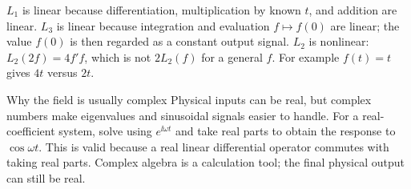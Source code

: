 \begin{answer}
$L_1$ is linear because differentiation, multiplication by known $t$, and addition are linear. $L_3$ is linear because integration and evaluation $f\mapsto f(0)$ are linear; the value $f(0)$ is then regarded as a constant output signal. $L_2$ is nonlinear: $L_2(2f)=4f'f$, which is not $2L_2(f)$ for a general $f$. For example $f(t)=t$ gives $4t$ versus $2t$.
\end{answer}
\begin{concept}{Why the field is usually complex}
Physical inputs can be real, but complex numbers make eigenvalues and sinusoidal signals easier to handle. For a real-coefficient system, solve using $e^{\ii\omega t}$ and take real parts to obtain the response to $\cos\omega t$. This is valid because a real linear differential operator commutes with taking real parts. Complex algebra is a calculation tool; the final physical output can still be real.
\end{concept}

